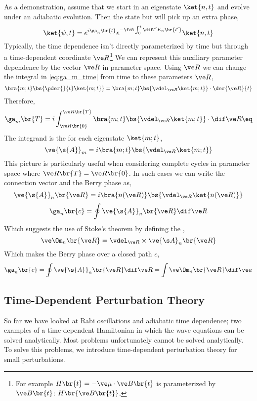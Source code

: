 \documentclass{article}
\begin{document}
As a demonstration, assume that we start in an eigenstate $\ket{n,t}$ and evolve under an adiabatic evolution. Then the state but will pick up an extra phase,
\[ \ket{\psi, t} = e^{i \ga_n\br{t}}e^{-\f i \hbar\int_{0}^{t}\dif t'E_n\br{t'} } \ket{n, t} \]
Typically, the time dependence isn't directly parameterized by time but through a time-dependent coordinate $\ve R$\footnote{For example $H\br{t} = - \ve \mu \cdot \ve B\br{t}$ is parameterized by $\ve B\br{t}$: $H\br{\ve B\br{t}}$.} We can represent this auxiliary parameter dependence by the vector $\ve R$ in parameter space. Using $\ve R$ we can change the integral in \cref{eq:ga_m_time} from time to these parameters $\ve R$,
\[ \bra{m; t} \bs{\pder{}{t} \ket{m; t}} = \bra{m; t} \bs{\vdel_{\ve R} \ket{m; t}} \cdot \der{\ve R}{t} \]
Therefore,
\[ \ga_m\br{T} = i \int_{\ve R\br{0}}^{\ve R\br{T}} \bra{m; t} \bs{\vdel_{\ve R} \ket{m; t}} \cdot \dif \ve R \eq \label{eq:ga_R} \]
The integrand is the  for each eigenstate $\ket{m; t}$,
\[ \ve {\s{A}}_m = i\bra{m; t} \bs{\vdel_{\ve R} \ket{m; t}} \]
This picture is particularly useful when considering complete cycles in parameter space where $\ve R\br{T} = \ve R\br{0}$. In such cases we can write the connection vector and the Berry phase as,
\[ \ve {\s{A}}_n\br{\ve R} = i\bra{n(\ve R)} \bs{\vdel_{\ve R} \ket{n(\ve R)}} \]
\[ \ga_n\br{c} = \oint \ve {\s{A}}_n\br{\ve R} \dif \ve R\]
Which suggests the use of Stoke's theorem by defining the ,
\[ \ve \Om_n\br{\ve R} = \vdel_{\ve R} \times \ve {\s A}_n\br{\ve R} \]
Which makes the Berry phase over a closed path $c$,
\[ \ga_n\br{c} = \oint \ve {\s{A}}_n\br{\ve R} \dif \ve R = \int \ve \Om_n\br{\ve R} \dif \ve a \]

\subsection{Time-Dependent Perturbation Theory}

So far we have looked at Rabi oscillations and adiabatic time dependence; two examples of a time-dependent Hamiltonian in which the wave equations can be solved analytically. Most problems unfortunately cannot be solved analytically. To solve this problems, we introduce time-dependent perturbation theory for small perturbations.\\
\end{document}
